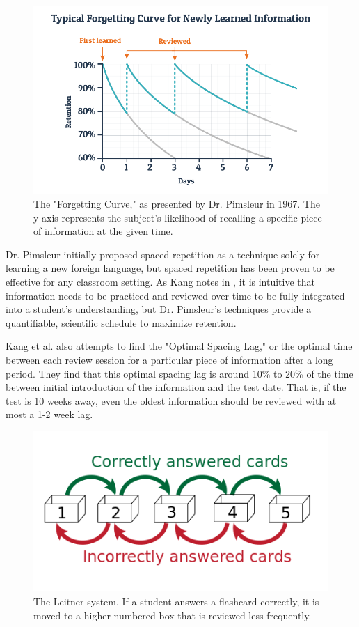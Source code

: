 \begin{figure}[h]
	\includegraphics[width=1.0\linewidth]{figures/forgetting-curve}
	\caption{The "Forgetting Curve," as presented by Dr. Pimsleur in 1967. The y-axis represents the subject's likelihood of recalling a specific piece of information at the given time.}
	\label{fig:forgetting-curve}
\end{figure}

\par Dr. Pimsleur initially proposed spaced repetition as a technique solely for learning a new foreign language, but spaced repetition has been proven to be effective for any classroom setting. As Kang notes in \cite{fiske2016spaced}, it is intuitive that information needs to be practiced and reviewed over time to be fully integrated into a student's understanding, but Dr. Pimsleur's techniques provide a quantifiable, scientific schedule to maximize retention.

\par Kang et al. \cite{fiske2016spaced} also attempts to find the "Optimal Spacing Lag," or the optimal time between each review session for a particular piece of information after a long period. They find that this optimal spacing lag is around 10\% to 20\% of the time between initial introduction of the information and the test date. That is, if the test is 10 weeks away, even the oldest information should be reviewed with at most a 1-2 week lag.

\begin{figure}[h]
	\includegraphics{figures/leitner}
	\caption{The Leitner system. If a student answers a flashcard correctly, it is moved to a higher-numbered box that is reviewed less frequently.}
	\label{fig:leitner}
\end{figure}

